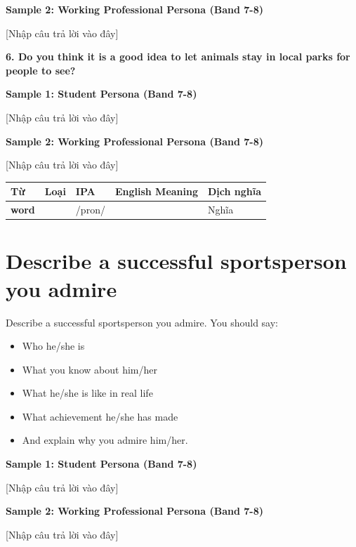 \textbf{Sample 2: Working Professional Persona (Band 7-8)}

[Nhập câu trả lời vào đây]

\separator

\begin{ieltsquestion}
\textbf{6. Do you think it is a good idea to let animals stay in local parks for people to see?}
\end{ieltsquestion}
\textbf{Sample 1: Student Persona (Band 7-8)}

[Nhập câu trả lời vào đây]

\textbf{Sample 2: Working Professional Persona (Band 7-8)}

[Nhập câu trả lời vào đây]

\separator


\vspace{0.8em}
\begin{center}
\renewcommand{\arraystretch}{1.65}
\begin{tabularx}{\textwidth}{|V{0.22\textwidth}|C{0.07\textwidth}|I{0.20\textwidth}|Y|V{0.18\textwidth}|}
\hline
{}
\textbf{Từ} & \textbf{Loại} & \textbf{IPA} & \textbf{English Meaning} & \textbf{Dịch nghĩa} \\
\hline
\textbf{word} & & /pron/ & & Nghĩa \\ \hline
\end{tabularx}
\end{center}

\newpage

\section{Describe a successful sportsperson you admire}
\begin{ieltsprompt}
Describe a successful sportsperson you admire.
You should say:
\begin{itemize}[leftmargin=2em, itemsep=2pt]
\item Who he/she is
\item What you know about him/her
\item What he/she is like in real life
\item What achievement he/she has made
\item And explain why you admire him/her.
\end{itemize}
\end{ieltsprompt}
\begin{ieltsanswer}
\textbf{Sample 1: Student Persona (Band 7-8)}

[Nhập câu trả lời vào đây]

\textbf{Sample 2: Working Professional Persona (Band 7-8)}

[Nhập câu trả lời vào đây]
\end{ieltsanswer}


